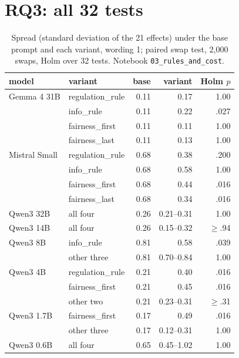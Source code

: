 \documentclass[11pt]{article}
\begin{document}
\section{RQ3: all 32 tests}
\label{sec:appendix-rq3}

\begin{table}[h]
\centering
\small
\begin{tabular}{llrrr}
\toprule
model & variant & base & variant & Holm $p$ \\
\midrule
Gemma 4 31B & regulation\_rule & 0.11 & 0.17 & 1.00 \\
 & info\_rule & 0.11 & 0.22 & .027 \\
 & fairness\_first & 0.11 & 0.11 & 1.00 \\
 & fairness\_last & 0.11 & 0.13 & 1.00 \\
Mistral Small & regulation\_rule & 0.68 & 0.38 & .200 \\
 & info\_rule & 0.68 & 0.58 & 1.00 \\
 & fairness\_first & 0.68 & 0.44 & .016 \\
 & fairness\_last & 0.68 & 0.34 & .016 \\
Qwen3 32B & all four & 0.26 & 0.21--0.31 & 1.00 \\
Qwen3 14B & all four & 0.26 & 0.15--0.32 & $\geq$.94 \\
Qwen3 8B & info\_rule & 0.81 & 0.58 & .039 \\
 & other three & 0.81 & 0.70--0.84 & 1.00 \\
Qwen3 4B & regulation\_rule & 0.21 & 0.40 & .016 \\
 & fairness\_first & 0.21 & 0.45 & .016 \\
 & other two & 0.21 & 0.23--0.31 & $\geq$.31 \\
Qwen3 1.7B & fairness\_first & 0.17 & 0.49 & .016 \\
 & other three & 0.17 & 0.12--0.31 & 1.00 \\
Qwen3 0.6B & all four & 0.65 & 0.45--1.02 & 1.00 \\
\bottomrule
\end{tabular}
\caption{Spread (standard deviation of the 21 effects) under the base prompt and each variant, wording 1;
paired swap test, 2,000 swaps, Holm over 32 tests. Notebook \texttt{03\_rules\_and\_cost}.}
\label{tab:rq3}
\end{table}
\end{document}
